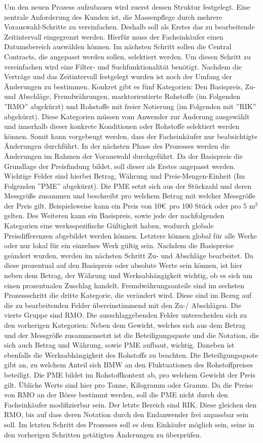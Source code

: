 Um den neuen Prozess aufzubauen wird zuerst dessen Struktur festgelegt. Eine zentrale Anforderung des Kunden ist, die Massenpflege durch mehrere Vorauswahl-Schritte zu vereinfachen. Deshalb soll als Erstes das zu bearbeitende Zeitintervall eingegrenzt werden. Hierfür muss der Facheinkäufer einen Datumsbereich auswählen können. Im nächsten Schritt sollen die Central Contracts, die angepasst werden sollen, selektiert werden. Um diesen Schritt zu vereinfachen wird eine Filter- und Suchfunktionalität benötigt. Nachdem die Verträge und das Zeitintervall festgelegt wurden ist noch der Umfang der Änderungen zu bestimmen. Konkret gibt es fünf Kategorien: Den Basispreis, Zu- und Abschläge, Fremdwährungen, marktorientierte Rohstoffe (im Folgenden ''RMO'' abgekürzt) und Rohstoffe mit freier Notierung (im Folgenden mit ''RIK'' abgekürzt). Diese Kategorien müssen vom Anwender zur Änderung ausgewählt und innerhalb dieser konkrete Konditionen oder Rohstoffe selektiert werden können. Somit kann vorgebeugt werden, dass der Facheinkäufer nur beabsichtigte Änderungen durchführt. In der nächsten Phase des Prozesses werden die Änderungen im Rahmen der Vorauswahl durchgeführt. Da der Basispreis die Grundlage der Preisfindung bildet, soll dieser als Erstes angepasst werden. Wichtige Felder sind hierbei Betrag, Währung und Preis-Mengen-Einheit (Im Folgenden ''PME'' abgekürzt). Die PME setzt sich aus der Stückzahl und deren Messgrö\ss e zusammen und beschreibt pro welchem Betrag mit welcher Messgrö\ss e der Preis gilt. Beispielsweise kann ein Preis von 10\euro\ pro 100 Stück oder pro 5 m$^2$ gelten. Des Weiteren kann ein Basispreis, sowie jede der nachfolgenden Kategorien eine werksspezifische Gültigkeit haben, wodurch globale Preisdifferenzen abgebildet werden können. Letztere können global für alle Werke oder nur lokal für ein einzelnes Werk gültig sein. Nachdem die Basispreise geändert wurden, werden im nächsten Schritt Zu- und Abschläge bearbeitet. Da diese prozentual auf den Basispreis oder absolute Werte sein können, ist hier neben dem Betrag, der Währung und Werksabhängigkeit wichtig, ob es sich um einen prozentualen Zuschlag handelt. Fremdwährungsanteile sind im sechsten Prozessschritt die dritte Kategorie, die verändert wird. Diese sind im Bezug auf die zu bearbeitenden Felder übereinstimmend mit den Zu-/ Abschlägen. Die vierte Gruppe sind RMO. Die ausschlaggebenden Felder unterscheiden sich zu den vorherigen Kategorien: Neben dem Gewicht, welches sich aus dem Betrag und der Messgrö\ss e zusammensetzt ist die Beteiligungsquote und die Notation, die sich auch Betrag und Währung, sowie PME aufbaut, wichtig. Daneben ist ebenfalls die Werksabhängigkeit des Rohstoffs zu beachten. Die Beteiligungsquote gibt an, zu welchem Anteil sich BMW an den Fluktuationen des Rohstoffpreises beteiligt. Die PME bildet im Rohstoffkontext ab, pro welchem Gewicht der Preis gilt. Übliche Werte sind hier pro Tonne, Kilogramm oder Gramm. Da die Preise von RMO an der Börse bestimmt werden, soll die PME nicht durch den Facheinkäufer modifizierbar sein. Der letzte Bereich sind RIK. Diese gleichen den RMO, bis auf dass deren Notation durch den Endanwender frei anpassbar sein soll. Im letzten Schritt des Prozesses soll es dem Einkäufer möglich sein, seine in den vorherigen Schritten getätigten Änderungen zu überprüfen. 
